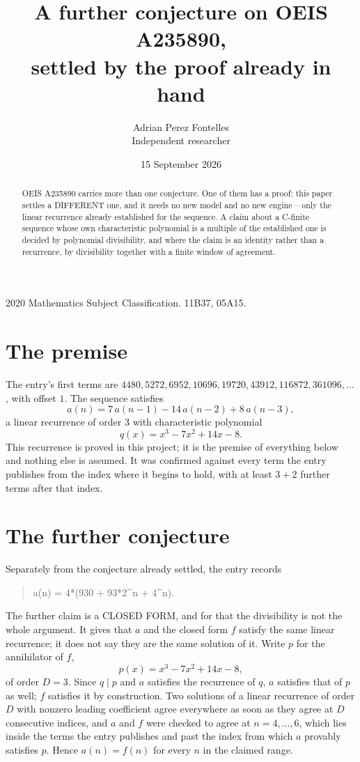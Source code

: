 \documentclass[11pt,a4paper]{article}
\title{A further conjecture on OEIS A235890,\\ \large settled by the proof already in hand}
\author{Adrian Perez Fontelles\\ \small Independent researcher}
\date{15 September 2026}
\theoremstyle{plain}
\theoremstyle{definition}
\begin{document}
\maketitle

\begin{abstract}
OEIS A235890 carries more than one conjecture. One of them has a proof; this paper settles a
DIFFERENT one, and it needs no new model and no new engine -- only the linear recurrence already
established for the sequence. A claim about a C-finite sequence whose own characteristic
polynomial is a multiple of the established one is decided by polynomial divisibility, and where
the claim is an identity rather than a recurrence, by divisibility together with a finite window
of agreement.
\end{abstract}

\noindent\small 2020 Mathematics Subject Classification. 11B37, 05A15.\normalsize

\section{The premise}

The entry's first terms are $4480, 5272, 6952, 10696, 19720, 43912, 116872, 361096,\dots$, with offset $1$. The sequence satisfies
\[
  a(n)=7\,a(n-1) - 14\,a(n-2) + 8\,a(n-3) ,
\]
a linear recurrence of order $3$ with characteristic polynomial
\[
  q(x)=x^{3} - 7 x^{2} + 14 x - 8 .
\]
This recurrence is proved in this project; it is the premise of everything below and nothing else is assumed.
It was confirmed against every term the entry publishes from the index where it begins to hold,
with at least $3+2$ further terms after that index.

\section{The further conjecture}

Separately from the conjecture already settled, the entry records

\begin{quote}\raggedright a(n) = 4*(930 + 93*2\^{}n + 4\^{}n).\end{quote}

The further claim is a CLOSED FORM, and for that the divisibility is not the whole argument. It
gives that $a$ and the closed form $f$ satisfy the same linear recurrence; it does not say they
are the same solution of it. Write $p$ for the annihilator of $f$,
\[
  p(x)=x^{3} - 7 x^{2} + 14 x - 8 ,
\]
of order $D=3$. Since $q\mid p$ and $a$ satisfies the recurrence of $q$, $a$ satisfies that of
$p$ as well; $f$ satisfies it by construction. Two solutions of a linear recurrence of order $D$
with nonzero leading coefficient agree everywhere as soon as they agree at $D$ consecutive
indices, and $a$ and $f$ were checked to agree at $n=4,\dots,6$,
which lies inside the terms the entry publishes and past the index from which $a$ provably
satisfies $p$. Hence $a(n)=f(n)$ for every $n$ in the claimed range.
\end{document}
